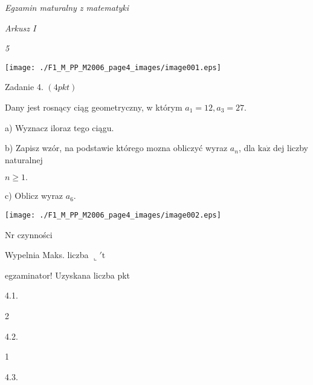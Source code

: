\documentclass[a4paper,12pt]{article}
\begin{document}
{\it Egzamin maturalny z matematyki}

{\it Arkusz I}

{\it 5}
\begin{center}
\texttt{[image: ./F1\_M\_PP\_M2006\_page4\_images/image001.eps]}
\end{center}
Zadanie 4. $(4pkt)$

Dany jest rosnący ciąg geometryczny, w którym $a_{1}=12, a_{3}=27.$

a) Wyznacz iloraz tego ciągu.

b) Zapisz wzór, na podstawie którego mozna obliczyć wyraz $a_{n}$, dla $\mathrm{k}\mathrm{a}\dot{\mathrm{z}}$ dej liczby naturalnej

$n\geq 1.$

c) Oblicz wyraz $a_{6}.$
\begin{center}
\texttt{[image: ./F1\_M\_PP\_M2006\_page4\_images/image002.eps]}
\end{center}
Nr czynności

Wypelnia Maks. liczba $\llcorner\prime \mathrm{t}$

egzaminator! Uzyskana liczba pkt

4.1.

2

4.2.

1

4.3.
\end{document}
